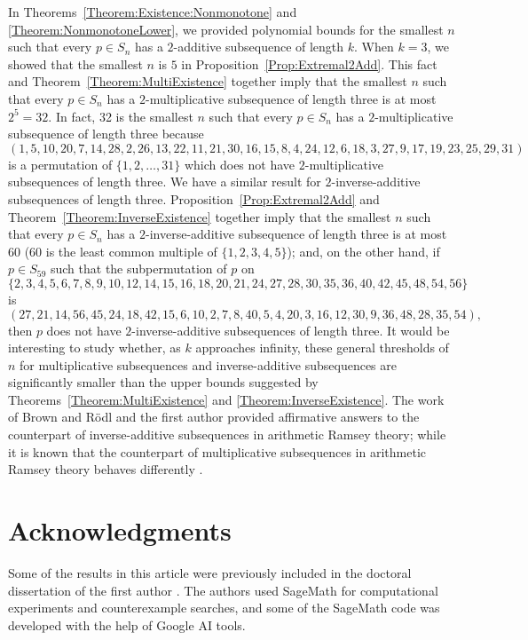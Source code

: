 \documentclass[11pt]{article}
\theoremstyle{definition}
\begin{document}
In Theorems~\ref{Theorem:Existence:Nonmonotone} and \ref{Theorem:NonmonotoneLower}, we provided polynomial bounds for the smallest $n$ such that every $p\in S_n$ has a $2$-additive subsequence of length $k$. When $k=3$, we showed that the smallest $n$ is $5$ in Proposition~\ref{Prop:Extremal2Add}. This fact and Theorem~\ref{Theorem:MultiExistence} together imply that the smallest $n$ such that every $p\in S_n$ has a $2$-multiplicative subsequence of length three is at most $2^5=32$. In fact, 32 is the smallest $n$ such that every $p\in S_n$ has a $2$-multiplicative subsequence of length three because 
\[
(1,5,10,20,7,14,28,2,26,13,22,11,21,30,16,15,8,4,24,12,6,18,3,27,9,17,19,23,25,29,31)
\]
is a permutation of $\{1,2,\ldots,31\}$ which does not have $2$-multiplicative subsequences of length three. We have a similar result for $2$-inverse-additive subsequences of length three. Proposition~\ref{Prop:Extremal2Add} and Theorem~\ref{Theorem:InverseExistence} together imply that the smallest $n$ such that every $p\in S_n$ has a $2$-inverse-additive subsequence of length three is at most $60$ ($60$ is the least common multiple of $\{1,2,3,4,5\}$); and, on the other hand, if $p\in S_{59}$ such that the subpermutation of $p$ on \[\{2,3,4,5,6,7,8,9,10,12,14,15,16,18,20,21,24,27,28,30,35,36,40,42,45,48,54,56\}\]
    is
    \[
    (27,21,14,56,45,24,18,42,15,6,10,2,7,8,40,5,4,20,3,16,12,30,9,36,48,28,35,54),
    \]
then $p$ does not have $2$-inverse-additive subsequences of length three. It would be interesting to study whether, as $k$ approaches infinity, these general thresholds of $n$ for multiplicative subsequences and inverse-additive subsequences are significantly smaller than the upper bounds suggested by Theorems~\ref{Theorem:MultiExistence} and \ref{Theorem:InverseExistence}. The work of Brown and R\"{o}dl \cite{BrownRodl1991} and the first author \cite{Gaiser2024} provided affirmative answers to the counterpart of inverse-additive subsequences in arithmetic Ramsey theory; while it is known that the counterpart of multiplicative subsequences in arithmetic Ramsey theory behaves differently \cite[Section 6]{ACOS2025}.

\section*{Acknowledgments}
Some of the results in this article were previously included in the doctoral dissertation of the first author \cite{Gaiser2024b}. The authors used SageMath for computational experiments and counterexample searches, and some of the SageMath code was developed with the help of Google AI tools.
\end{document}
